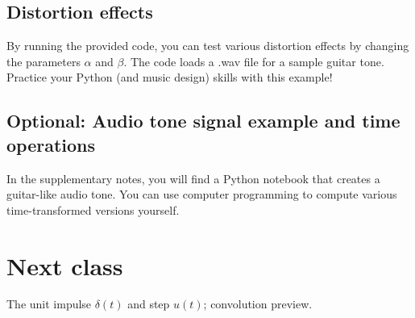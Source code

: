 \documentclass{ee102_notes}
\begin{document}
\subsection{Distortion effects}
By running the provided code, you can test various distortion effects by changing the parameters $\alpha$ and $\beta$. The code loads a .wav file for a sample guitar tone. Practice your Python (and music design) skills with this example!
\subsection{Optional: Audio tone signal example and time operations}
In the supplementary notes, you will find a Python notebook that creates a guitar-like audio tone. You can use computer programming to compute various time-transformed versions yourself.

\section*{Next class}
The unit impulse $\delta(t)$ and step $u(t)$; convolution preview.
\end{document}
